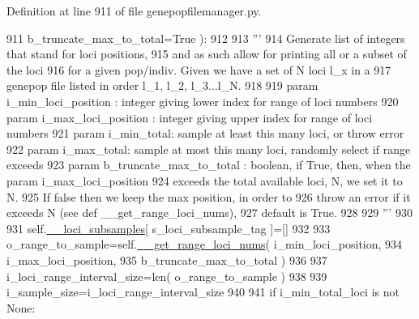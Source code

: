 Definition at line 911 of file genepopfilemanager.\+py.


\begin{DoxyCode}
911             b\_truncate\_max\_to\_total=\textcolor{keyword}{True} ):
912             
913         \textcolor{stringliteral}{'''}
914 \textcolor{stringliteral}{        Generate list of integers that stand for loci positions,}
915 \textcolor{stringliteral}{        and as such allow for printing all or a subset of the loci}
916 \textcolor{stringliteral}{        for a given pop/indiv.  Given we have a set of N loci l\_x in a}
917 \textcolor{stringliteral}{        genepop file listed in order l\_1, l\_2, l\_3...l\_N.}
918 \textcolor{stringliteral}{}
919 \textcolor{stringliteral}{        param i\_min\_loci\_position : integer giving lower index for range of loci numbers}
920 \textcolor{stringliteral}{        param i\_max\_loci\_position : integer giving upper index for range of loci numbers}
921 \textcolor{stringliteral}{        param i\_min\_total: sample at least this many loci, or throw error}
922 \textcolor{stringliteral}{        param i\_max\_total: sample at most this many loci, randomly select if range exceeds}
923 \textcolor{stringliteral}{        param b\_truncate\_max\_to\_total : boolean, if True, then, when the param i\_max\_loci\_position}
924 \textcolor{stringliteral}{                                        exceeds the total available loci, N, we set it to N.  }
925 \textcolor{stringliteral}{                                        If false then we keep the max position, in order to }
926 \textcolor{stringliteral}{                                        throw an error if it exceeds N (see def \_\_get\_range\_loci\_nums), }
927 \textcolor{stringliteral}{                                        default is True.}
928 \textcolor{stringliteral}{}
929 \textcolor{stringliteral}{        '''}
930 
931         self.\hyperlink{classnegui_1_1genepopfilemanager_1_1GenepopFileManager_af867ba70728e8a3aaf0097ddd6399e28}{\_\_loci\_subsamples}[ s\_loci\_subsample\_tag ]=[]
932 
933         o\_range\_to\_sample=self.\hyperlink{classnegui_1_1genepopfilemanager_1_1GenepopFileManager_aaa92e1946fdacb522325a288e00eac71}{\_\_get\_range\_loci\_nums}( i\_min\_loci\_position, 
934                                                             i\_max\_loci\_position,
935                                                             b\_truncate\_max\_to\_total )
936         
937         i\_loci\_range\_interval\_size=len( o\_range\_to\_sample )
938 
939         i\_sample\_size=i\_loci\_range\_interval\_size 
940 
941         \textcolor{keywordflow}{if} i\_min\_total\_loci \textcolor{keywordflow}{is} \textcolor{keywordflow}{not} \textcolor{keywordtype}{None}:

\end{DoxyCode}
